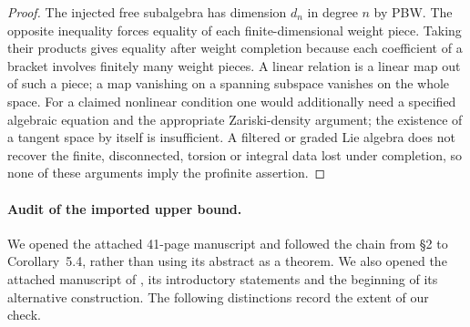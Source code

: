 \begin{proof}
The injected free subalgebra has dimension $d_n$ in degree $n$ by
PBW.  The opposite inequality forces equality of each finite-dimensional
weight piece.  Taking their products gives equality after weight
completion because each coefficient of a bracket involves finitely
many weight pieces.  A linear relation is a linear map out of such a
piece; a map vanishing on a spanning subspace vanishes on the whole
space.  For a claimed nonlinear condition one would additionally
need a specified algebraic equation and the appropriate Zariski-density
argument; the existence of a tangent space by itself is insufficient.
A filtered or graded Lie algebra does not recover the finite,
disconnected, torsion or integral data lost under completion, so none
of these arguments imply the profinite assertion.
\end{proof}

\paragraph{Audit of the imported upper bound.}
We opened the attached 41-page manuscript and followed the chain from
\S2 to Corollary~5.4, rather than using its abstract as a theorem.
We also opened the attached manuscript of \citet{Willwacher2026g}, its introductory
statements and the beginning of its alternative construction.  The
following distinctions record the extent of our check.

